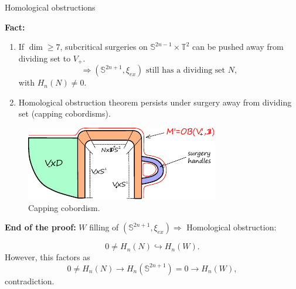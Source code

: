 \documentclass{beamer}
\begin{document}
\begin{frame}{Homological obstructions}

\textbf{Fact:} 

\begin{enumerate}
    \item If $\dim \geq 7$, subcritical surgeries on $\mathbb S^{2n-1}\times \mathbb T^2$ can be pushed away from dividing set to $V_+$.
$$
\Rightarrow (\mathbb S^{2n+1},\xi_{ex}) \mbox{ still has a dividing set } N,
$$
with $H_n(N)\neq 0$.

\pause 
\item Homological obstruction theorem persists under surgery away from dividing set (capping cobordisms).
\end{enumerate}


\begin{figure}
    \centering
    \includegraphics[width=0.7\linewidth]{blowdown_handle.pdf}
    \caption{Capping cobordism.}
    \label{fig:capping_cobordism}
\end{figure}

\end{frame}

\begin{frame}

\textbf{End of the proof:} $W$ filling of $(\mathbb S^{2n+1},\xi_{ex}) \Rightarrow$ Homological obstruction: 

$$
0\neq H_n(N) \hookrightarrow H_n(W).
$$
However, this factors as
$$
0\neq H_n(N) \rightarrow H_n(\mathbb S^{2n+1})=0 \rightarrow H_n(W),
$$
contradiction.
\end{frame}
\end{document}
